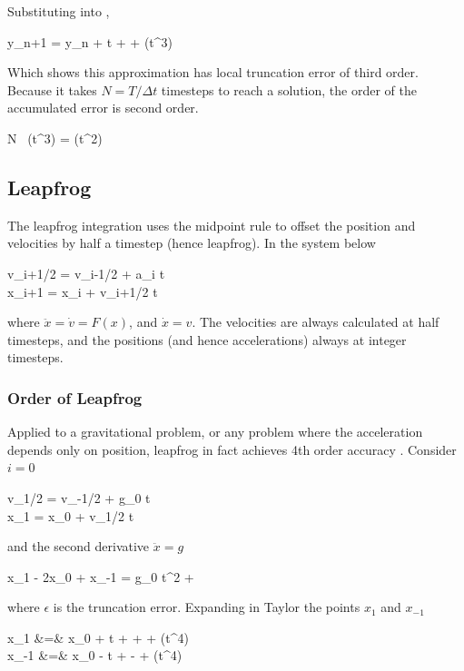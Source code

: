 Substituting into ,

\beq
y_{n+1} = y_n + \Delta t +
 +
(\Delta t^3)
\eeq

Which shows this approximation has local truncation error of third order. Because it takes $N=T/\Delta t$ timesteps to reach a
solution, the order of the accumulated error is second order. 

\beq
N \ (\Delta t^3)  = (\Delta t^2)
\eeq

\subsection{Leapfrog}

The leapfrog integration uses the midpoint rule to offset the position and velocities by half a timestep (hence leapfrog). In the system below

\beqn
v_{i+1/2} = v_{i-1/2} + a_i \Delta t \\
x_{i+1} = x_i + v_{i+1/2} \Delta t
\eeqn

where $\ddot{x} = \dot{v} = F(x)$, and $\dot{x}=v$. The
velocities are always calculated at half timesteps, and the positions (and hence accelerations) always at integer timesteps. 

\subsubsection{Order of Leapfrog} 

Applied to a gravitational problem, or any problem where the acceleration depends only on position,
leapfrog in fact achieves 4th order accuracy . Consider $i=0$

\beqn
v_{1/2} = v_{-1/2} + g_0 \Delta t \\
x_1 = x_0 + v_{1/2} \Delta t
\eeqn

and the second derivative $\ddot{x}=g$

\beq
x_1 - 2x_0 + x_{-1} = g_0 \Delta t^2 + \epsilon
\label{eq:leap1}
\eeq

where $\epsilon$ is the truncation error. Expanding in Taylor the points $x_1$ and $x_{-1}$

\beqn
x_1 &=& x_0 + \Delta t +  +  + \left(\Delta t^4\right)\\
x_{-1} &=& x_0 - \Delta t +  -  + \left(\Delta t^4\right)\\
\eeqn

